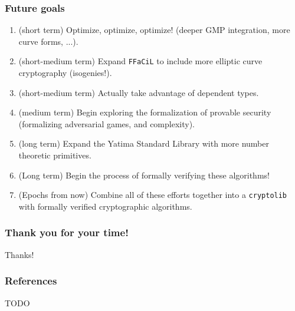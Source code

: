 \documentclass[options]{beamer}
\begin{document}
\begin{frame}[fragile]
    \frametitle{Future goals}

    \begin{enumerate}
        \item (short term) Optimize, optimize, optimize! (deeper GMP integration, more curve forms, ...).
        \item (short-medium term) Expand \verb+FFaCiL+ to include more elliptic curve cryptography (isogenies!).
        \item (short-medium term) Actually take advantage of dependent types.
        \item (medium term) Begin exploring the formalization of provable security (formalizing adversarial games, and complexity).
        \item (long term) Expand the Yatima Standard Library with more number theoretic primitives.
        \item (Long term) Begin the process of formally verifying these algorithms!
        \item (Epochs from now) Combine all of these efforts together into a \verb+cryptolib+ with formally verified cryptographic algorithms.
    \end{enumerate}

\end{frame}

\begin{frame}
    \frametitle{Thank you for your time!}
    \begin{center}
    Thanks!
    \end{center}
\end{frame}

\begin{frame}
    \frametitle{References}

    TODO

\end{frame}
\end{document}
